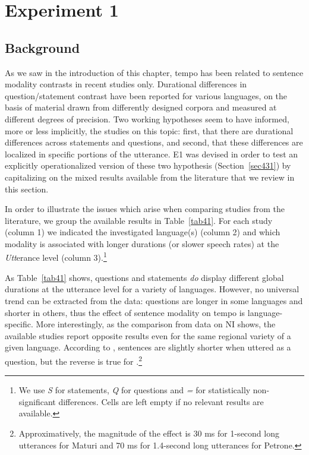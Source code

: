 \section{Experiment 1}\label{sec43}
\subsection{Background}\label{sec430}
As we saw in the introduction of this chapter, tempo has been related to sentence modality contrasts in recent studies only. Durational differences in question/statement contrast have been reported for various languages, on the basis of material drawn from differently designed corpora and measured at different degrees of precision. Two working hypotheses seem to have informed, more or less implicitly, the studies on this topic: first, that there are durational differences across statements and questions, and second, that these differences are localized in specific portions of the utterance. E1 was devised in order to test an explicitly operationalized version of these two hypothesis (Section~\ref{sec431}) by capitalizing on the mixed results available from the literature that we review in this section.

In order to illustrate the issues which arise when comparing studies from the literature, we group the available results in Table~\ref{tab41}. For each study (column 1) we indicated the investigated language(s) (column 2) and which modality is associated with longer durations (or slower speech rates) at the \textit{Utt}erance level (column 3).\footnote{We use \textit{S} for statements, \textit{Q} for questions and \textit{=} for statistically non-significant differences. Cells are left empty if no relevant results are available.} 

As Table~\ref{tab41} shows, questions and statements \textit{do} display different global durations at the utterance level for a variety of languages. However, no universal trend can be extracted from the data: questions are longer in some languages and shorter in others, thus the effect of sentence modality on tempo is language-specific. More interestingly, as the comparison from data on NI shows, the available studies report opposite results even for the same regional variety of a given language. According to \citet[table 6]{maturi1988intonazione}, sentences are slightly shorter when uttered as a question, but the reverse is true for \citet[163]{petrone2008role}.\footnote{Approximatively, the magnitude of the effect is 30 ms for 1-second long utterances for Maturi and 70 ms for 1.4-second long utterances for Petrone.} 

